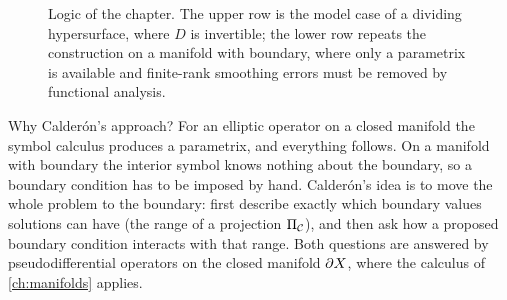 \begin{figure}[ht]
  \centering
  \caption{Logic of the chapter. The upper row is the model case of a dividing
  hypersurface, where $D$ is invertible; the lower row repeats the construction on a
  manifold with boundary, where only a parametrix is available and finite-rank
  smoothing errors must be removed by functional analysis.}
  \label{boundary:fig:roadmap}
\end{figure}

\begin{discussion}
Why Calder\'on's approach? For an elliptic operator on a closed manifold the
symbol calculus produces a parametrix, and everything follows. On a manifold with
boundary the interior symbol knows nothing about the boundary, so a boundary
condition has to be imposed by hand. Calder\'on's idea is to move the whole problem
to the boundary: first describe exactly which boundary values solutions can have
(the range of a projection $\Pi_{\mathcal{C}}$), and then ask how a proposed boundary condition
interacts with that range. Both questions are answered by pseudodifferential
operators on the closed manifold $\partial X$, where the calculus of \cref{ch:manifolds}
applies.
\end{discussion}

